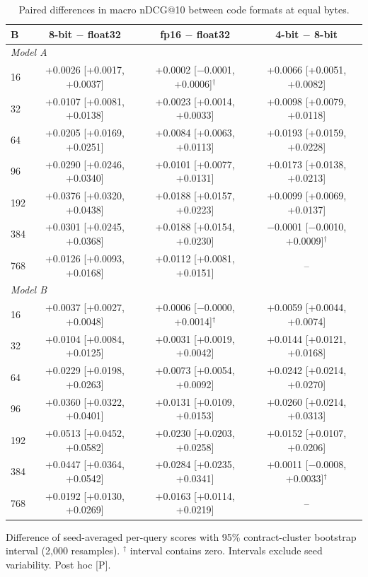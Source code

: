 \begin{table}[t]
\centering\small
\caption{Paired differences in macro nDCG@10 between code formats at equal bytes.}
\label{tab:ladder_contrasts}
\begin{tabular}{lccc}
\toprule
B & 8-bit $-$ float32 & fp16 $-$ float32 & 4-bit $-$ 8-bit \\
\midrule
\multicolumn{4}{l}{\textit{Model A}} \\
16 & +0.0026 [+0.0017, +0.0037] & +0.0002 [$-$0.0001, +0.0006]$^\dagger$ & +0.0066 [+0.0051, +0.0082] \\
32 & +0.0107 [+0.0081, +0.0138] & +0.0023 [+0.0014, +0.0033] & +0.0098 [+0.0079, +0.0118] \\
64 & +0.0205 [+0.0169, +0.0251] & +0.0084 [+0.0063, +0.0113] & +0.0193 [+0.0159, +0.0228] \\
96 & +0.0290 [+0.0246, +0.0340] & +0.0101 [+0.0077, +0.0131] & +0.0173 [+0.0138, +0.0213] \\
192 & +0.0376 [+0.0320, +0.0438] & +0.0188 [+0.0157, +0.0223] & +0.0099 [+0.0069, +0.0137] \\
384 & +0.0301 [+0.0245, +0.0368] & +0.0188 [+0.0154, +0.0230] & $-$0.0001 [$-$0.0010, +0.0009]$^\dagger$ \\
768 & +0.0126 [+0.0093, +0.0168] & +0.0112 [+0.0081, +0.0151] & -- \\
\midrule
\multicolumn{4}{l}{\textit{Model B}} \\
16 & +0.0037 [+0.0027, +0.0048] & +0.0006 [$-$0.0000, +0.0014]$^\dagger$ & +0.0059 [+0.0044, +0.0074] \\
32 & +0.0104 [+0.0084, +0.0125] & +0.0031 [+0.0019, +0.0042] & +0.0144 [+0.0121, +0.0168] \\
64 & +0.0229 [+0.0198, +0.0263] & +0.0073 [+0.0054, +0.0092] & +0.0242 [+0.0214, +0.0270] \\
96 & +0.0360 [+0.0322, +0.0401] & +0.0131 [+0.0109, +0.0153] & +0.0260 [+0.0214, +0.0313] \\
192 & +0.0513 [+0.0452, +0.0582] & +0.0230 [+0.0203, +0.0258] & +0.0152 [+0.0107, +0.0206] \\
384 & +0.0447 [+0.0364, +0.0542] & +0.0284 [+0.0235, +0.0341] & +0.0011 [$-$0.0008, +0.0033]$^\dagger$ \\
768 & +0.0192 [+0.0130, +0.0269] & +0.0163 [+0.0114, +0.0219] & -- \\
\bottomrule
\end{tabular}
\par\smallskip\footnotesize Difference of seed-averaged per-query scores with 95\% contract-cluster bootstrap interval (2,000 resamples). $^\dagger$ interval contains zero. Intervals exclude seed variability. Post hoc [P].
\end{table}